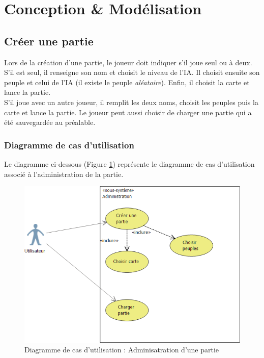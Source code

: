 \documentclass[a4paper,11pt]{article}
\begin{document}
\section{Conception \& Modélisation}
\subsection{Créer une partie}
Lors de la création d'une partie, le joueur doit indiquer s'il joue seul ou à deux. S'il est seul, il renseigne son nom et choisit le niveau de l'IA. Il choisit ensuite son peuple et celui de l'IA (il existe le peuple {\textit{aléatoire}}). Enfin, il choisit la carte et lance la partie.\medskip\\
S'il joue avec un autre joueur, il remplit les deux noms, choisit les peuples puis la carte et lance la partie.
Le joueur peut aussi choisir de charger une partie qui a été sauvegardée au préalable.
\subsubsection{Diagramme de cas d'utilisation}
Le diagramme ci-dessous (Figure \ref{dcu:ap}) représente le diagramme de cas d'utilisation associé à l'administration de la partie.
\begin{figure}[H]
	\centering
	\includegraphics[width=\textwidth]{fig/diagramme_cas_utilisation_administration}
	\caption{Diagramme de cas d'utilisation : Adminisatration d'une partie}
	\label{dcu:ap}
\end{figure} 
\end{document}
